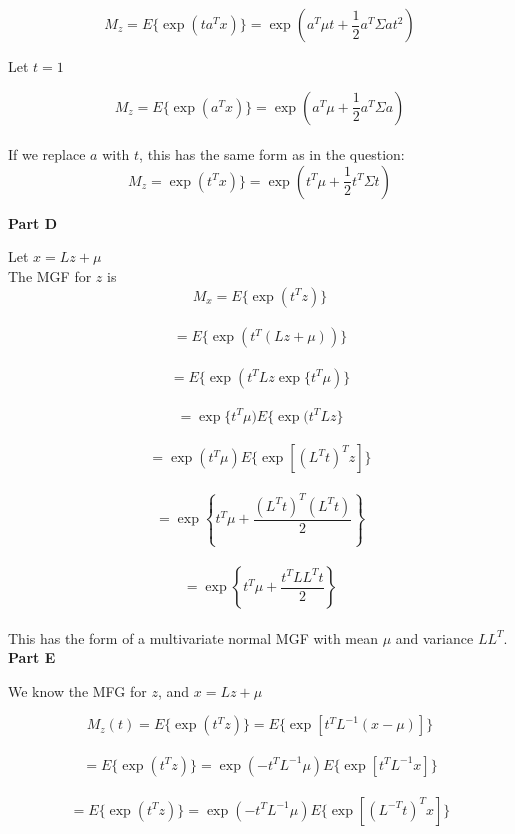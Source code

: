 \documentclass[12pt]{amsart}
\begin{document}
$$ M_z =E\{\exp(ta^Tx )\} =\exp\left(  a^T\mu t + \frac{1}{2}a^T \Sigma a t^2   \right)  $$

Let $t=1$

$$ M_z =E\{\exp(a^Tx )\}  = \exp\left(  a^T\mu  + \frac{1}{2}a^T \Sigma a \right)  $$\\

If we replace $a$ with $t$, this has the same form as in the question:\\

$$ M_z =\exp(t^Tx )\}  = \exp\left(  t^T\mu  + \frac{1}{2}t^T \Sigma t \right)  $$


{\bf Part D}\\
\bigskip

Let $x=Lz+\mu$\\

The MGF for $z$ is\\

$$ M_x = E\{\exp(t^Tz )\} $$\\

$$= E\{\exp(t^T(Lz+\mu) )\} $$\\


$$= E\{\exp(t^TLz \exp\{ t^T\mu )\} $$\\

$$= \exp\{ t^T\mu ) E\{\exp(t^TLz\} $$\\


$$= \exp( t^T\mu ) E\{\exp[(L^Tt)^Tz]\} $$\\


$$= \exp\left\{ t^T\mu +\frac{(L^Tt)^T(L^Tt)}{2}\right\} $$\\

$$= \exp\left\{ t^T\mu +\frac{t^TLL^Tt}{2}\right\} $$\\



This has the form of a multivariate normal MGF with mean $\mu$ and variance $LL^T$.\\


{\bf Part E}\\
\bigskip

We know the MFG for $z$, and $x=Lz+\mu$

$$M_z(t) = E\{\exp(t^Tz)\}= E\{\exp[t^TL^{-1}(x-\mu)]\}$$\\

$$ = E\{\exp(t^Tz)\}= \exp(-t^TL^{-1}\mu)E\{\exp[t^TL^{-1}x]\}$$\\

$$ = E\{\exp(t^Tz)\}= \exp(-t^TL^{-1}\mu)E\{\exp[(L^{-T}t)^Tx]\}$$\\
\end{document}

